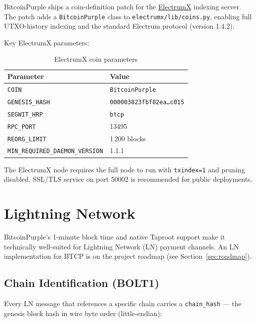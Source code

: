\documentclass[12pt, a4paper]{article}
\begin{document}
BitcoinPurple ships a coin-definition patch for the
\href{https://github.com/spesmilo/electrumx}{ElectrumX} indexing server.
The patch adds a \texttt{BitcoinPurple} class to
\texttt{electrumx/lib/coins.py}, enabling full UTXO-history indexing and the
standard Electrum protocol (version 1.4.2).

Key ElectrumX parameters:

\begin{table}[h!]
\centering
\caption{ElectrumX coin parameters}
\begin{tabular}{@{}ll@{}}
\toprule
\textbf{Parameter} & \textbf{Value} \\
\midrule
\texttt{COIN} & \texttt{BitcoinPurple} \\
\texttt{GENESIS\_HASH} & \texttt{000003823fbf82ea\ldots c015} \\
\texttt{SEGWIT\_HRP}   & \texttt{btcp} \\
\texttt{RPC\_PORT}     & 13495 \\
\texttt{REORG\_LIMIT}  & 1\,200 blocks \\
\texttt{MIN\_REQUIRED\_DAEMON\_VERSION} & 1.1.1 \\
\bottomrule
\end{tabular}
\end{table}

The ElectrumX node requires the full node to run with \texttt{txindex=1} and
pruning disabled.  SSL/TLS service on port 50002 is recommended for public
deployments.

\newpage
\section{Lightning Network}

BitcoinPurple's 1-minute block time and native Taproot support make it
technically well-suited for Lightning Network (LN) payment channels.  An
LN implementation for BTCP is on the project roadmap (see Section~\ref{sec:roadmap}).

\subsection{Chain Identification (BOLT1)}

Every LN message that references a specific chain carries a \texttt{chain\_hash}
— the genesis block hash in wire byte order (little-endian):
\end{document}
